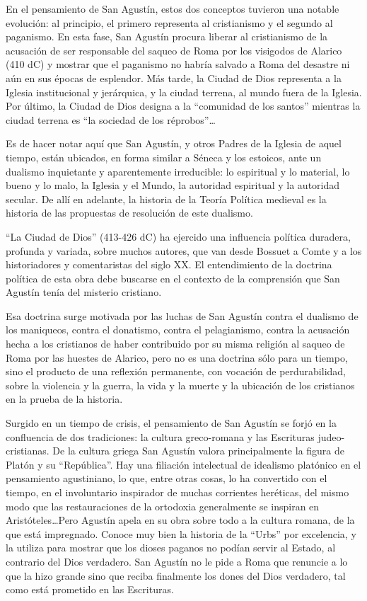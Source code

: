 \documentclass[
]{book}
\begin{document}
En el pensamiento de San Agustín, estos dos conceptos tuvieron una notable evolución: al principio, el primero representa al cristianismo y el segundo al paganismo. En esta fase, San Agustín procura liberar al cristianismo de la acusación de ser responsable del saqueo de Roma por los visigodos de Alarico (410 dC) y mostrar que el paganismo no habría salvado a Roma del desastre ni aún en sus épocas de esplendor. Más tarde, la Ciudad de Dios representa a la Iglesia institucional y jerárquica, y la ciudad terrena, al mundo fuera de la Iglesia. Por último, la Ciudad de Dios designa a la ``comunidad de los santos'' mientras la ciudad terrena es ``la sociedad de los réprobos''\ldots{}

Es de hacer notar aquí que San Agustín, y otros Padres de la Iglesia de aquel tiempo, están ubicados, en forma similar a Séneca y los estoicos, ante un dualismo inquietante y aparentemente irreducible: lo espiritual y lo material, lo bueno y lo malo, la Iglesia y el Mundo, la autoridad espiritual y la autoridad secular. De allí en adelante, la historia de la Teoría Política medieval es la historia de las propuestas de resolución de este dualismo.

``La Ciudad de Dios'' (413-426 dC) ha ejercido una influencia política duradera, profunda y variada, sobre muchos autores, que van desde Bossuet a Comte y a los historiadores y comentaristas del siglo XX. El entendimiento de la doctrina política de esta obra debe buscarse en el contexto de la comprensión que San Agustín tenía del misterio cristiano.

Esa doctrina surge motivada por las luchas de San Agustín contra el dualismo de los maniqueos, contra el donatismo, contra el pelagianismo, contra la acusación hecha a los cristianos de haber contribuido por su misma religión al saqueo de Roma por las huestes de Alarico, pero no es una doctrina sólo para un tiempo, sino el producto de una reflexión permanente, con vocación de perdurabilidad, sobre la violencia y la guerra, la vida y la muerte y la ubicación de los cristianos en la prueba de la historia.

Surgido en un tiempo de crisis, el pensamiento de San Agustín se forjó en la confluencia de dos tradiciones: la cultura greco-romana y las Escrituras judeo-cristianas. De la cultura griega San Agustín valora principalmente la figura de Platón y su ``República''. Hay una filiación intelectual de idealismo platónico en el pensamiento agustiniano, lo que, entre otras cosas, lo ha convertido con el tiempo, en el involuntario inspirador de muchas corrientes heréticas, del mismo modo que las restauraciones de la ortodoxia generalmente se inspiran en Aristóteles\ldots Pero Agustín apela en su obra sobre todo a la cultura romana, de la que está impregnado. Conoce muy bien la historia de la ``Urbs'' por excelencia, y la utiliza para mostrar que los dioses paganos no podían servir al Estado, al contrario del Dios verdadero. San Agustín no le pide a Roma que renuncie a lo que la hizo grande sino que reciba finalmente los dones del Dios verdadero, tal como está prometido en las Escrituras.
\end{document}
